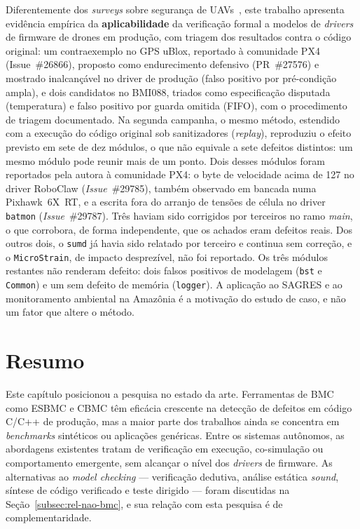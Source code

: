Diferentemente dos \textit{surveys} sobre segurança de
UAVs~\cite{Wanner2024, Siddiqi2022, Mekdad2023}, este trabalho apresenta
evidência empírica da \textbf{aplicabilidade} da verificação formal a modelos de
\textit{drivers} de firmware de drones em produção, com triagem dos resultados
contra o código original: um contraexemplo no GPS uBlox, reportado à comunidade
PX4 (Issue~\#26866), proposto como endurecimento defensivo (PR~\#27576) e mostrado
inalcançável no driver de produção (falso positivo por pré-condição ampla), e dois
candidatos no BMI088, triados como especificação disputada (temperatura) e falso
positivo por guarda omitida (FIFO), com o procedimento de triagem documentado. Na segunda campanha, o mesmo
método, estendido com a execução do código original sob sanitizadores (\textit{replay}),
reproduziu o efeito previsto em sete de dez módulos, o que não equivale a sete defeitos
distintos: um mesmo módulo pode reunir mais de um ponto. Dois desses módulos foram
reportados pela autora à comunidade PX4: o byte de velocidade acima de 127 no driver RoboClaw
(\textit{Issue}~\#29785), também observado em bancada numa Pixhawk~6X~RT, e a escrita fora
do arranjo de tensões de célula no driver \texttt{batmon} (\textit{Issue}~\#29787). Três
haviam sido corrigidos por terceiros no ramo \textit{main}, o que corrobora, de forma
independente, que os achados eram defeitos reais. Dos outros dois, o \texttt{sumd} já havia
sido relatado por terceiro e continua sem correção, e o \texttt{MicroStrain}, de impacto
desprezível, não foi reportado. Os três módulos restantes não renderam defeito: dois
falsos positivos de modelagem (\texttt{bst} e \texttt{Common}) e um sem defeito de memória
(\texttt{logger}). A aplicação ao SAGRES e ao
monitoramento ambiental na Amazônia é a motivação do estudo de caso, e não um
fator que altere o método.


\section{Resumo}
\label{sec:rel-resumo}

Este capítulo posicionou a pesquisa no estado da arte. Ferramentas de BMC como
ESBMC e CBMC têm eficácia crescente na detecção de defeitos em código C/C++ de
produção, mas a maior parte dos trabalhos ainda se concentra em \textit{benchmarks}
sintéticos ou aplicações genéricas. Entre os sistemas autônomos, as abordagens
existentes tratam de verificação em execução, co-simulação ou comportamento
emergente, sem alcançar o nível dos \textit{drivers} de firmware. As alternativas
ao \textit{model checking} --- verificação dedutiva, análise estática
\textit{sound}, síntese de código verificado e teste dirigido --- foram discutidas
na Seção~\ref{subsec:rel-nao-bmc}, e sua relação com esta pesquisa é de
complementaridade.

